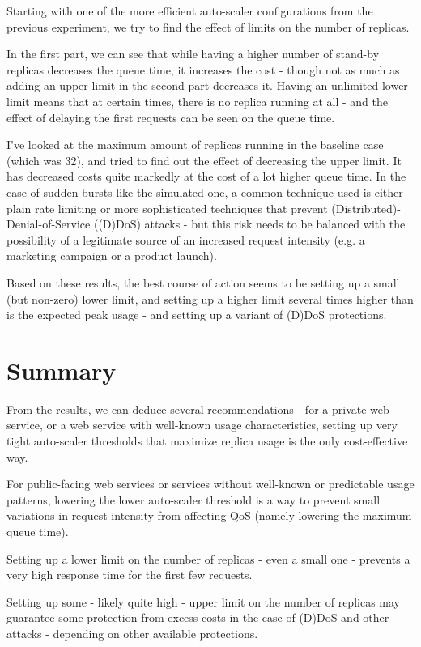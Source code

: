\documentclass{scrartcl}
\begin{document}
Starting with one of the more efficient auto-scaler configurations from the
previous experiment, we try to find the effect of limits on the number of
replicas.

In the first part, we can see that while having a higher number of stand-by
replicas decreases the queue time, it increases the cost - though not as much as
adding an upper limit in the second part decreases it. Having an unlimited lower
limit means that at certain times, there is no replica running at all - and the
effect of delaying the first requests can be seen on the queue time.

I've looked at the maximum amount of replicas running in the baseline case
(which was 32), and tried to find out the effect of decreasing the upper
limit. It has decreased costs quite markedly at the cost of a lot higher queue
time. In the case of sudden bursts like the simulated one, a common technique
used is either plain rate limiting or more sophisticated techniques that prevent
(Distributed)-Denial-of-Service ((D)DoS) attacks - but this risk needs to be balanced
with the possibility of a legitimate source of an increased request intensity
(e.g. a marketing campaign or a product launch).

Based on these results, the best course of action seems to be setting up a small
(but non-zero) lower limit, and setting up a higher limit several times higher
than is the expected peak usage - and setting up a variant of (D)DoS protections.


\section{Summary}
\label{sec-6}
From the results, we can deduce several recommendations - for a private web
service, or a web service with well-known usage characteristics, setting up very
tight auto-scaler thresholds that maximize replica usage is the only
cost-effective way.

For public-facing web services or services without well-known or predictable
usage patterns, lowering the lower auto-scaler threshold is a way to prevent
small variations in request intensity from affecting QoS (namely lowering the
maximum queue time).

Setting up a lower limit on the number of replicas - even a small one -
prevents a very high response time for the first few requests.

Setting up some - likely quite high - upper limit on the number of replicas may
guarantee some protection from excess costs in the case of (D)DoS and other
attacks - depending on other available protections.
\end{document}

